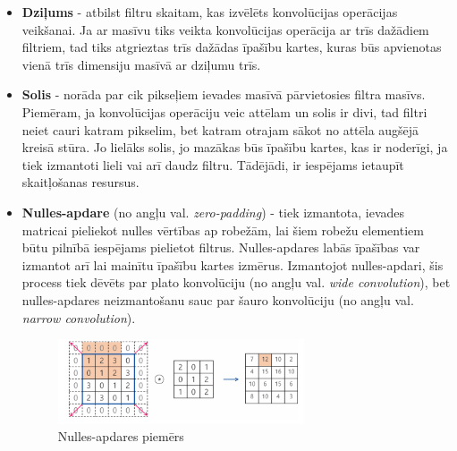 \begin{itemize}
	\item \textbf{Dziļums} - atbilst filtru skaitam, kas izvēlēts konvolūcijas operācijas veikšanai. Ja ar masīvu tiks veikta konvolūcijas operācija ar trīs dažādiem filtriem, tad tiks atgrieztas trīs dažādas īpašību kartes, kuras būs apvienotas vienā trīs dimensiju masīvā ar dziļumu trīs.
	\item \textbf{Solis} - norāda par cik pikseļiem ievades masīvā pārvietosies filtra masīvs. Piemēram, ja konvolūcijas operāciju veic attēlam un solis ir divi, tad filtri neiet cauri katram pikselim, bet katram otrajam sākot no attēla augšējā kreisā stūra. Jo lielāks solis, jo mazākas būs īpašību kartes, kas ir noderīgi, ja tiek izmantoti lieli vai arī daudz filtru. Tādējādi, ir iespējams ietaupīt skaitļošanas resursus. 
	\item \textbf{Nulles-apdare} (no angļu val. \textit{zero-padding}) - tiek izmantota, ievades matricai pieliekot nulles vērtības ap robežām, lai šiem robežu elementiem būtu pilnībā iespējams pielietot filtrus. Nulles-apdares labās īpašības var izmantot arī lai mainītu īpašību kartes izmērus. Izmantojot nulles-apdari, šis process tiek dēvēts par plato konvolūciju (no angļu val. \textit{wide convolution}), bet nulles-apdares neizmantošanu sauc par šauro konvolūciju (no angļu val. \textit{narrow convolution}). 
	\begin{figure}[h]%
		\centering
		\includegraphics[height=2.5cm]{images/zero-padding.png} %
		\caption{Nulles-apdares piemērs \cite{zerpad}}%
		\label{fig:example}%
	\end{figure}
\end{itemize}
